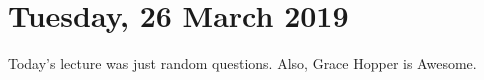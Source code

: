 
\section{Tuesday, 26 March 2019}

Today's lecture was just random questions. 
Also, Grace Hopper is Awesome.